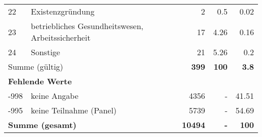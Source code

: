 \begin{longtable}{lXrrr}
        22 & \multicolumn{1}{X}{Existenzgründung} & %
          \num{2} &
          \num[round-mode=places,round-precision=2]{0,5} &
          \num[round-mode=places,round-precision=2]{0,02} \\

        23 & \multicolumn{1}{X}{betriebliches Gesundheitswesen, Arbeitssicherheit} & %
          \num{17} &
          \num[round-mode=places,round-precision=2]{4,26} &
          \num[round-mode=places,round-precision=2]{0,16} \\

        24 & \multicolumn{1}{X}{Sonstige} & %
          \num{21} &
          \num[round-mode=places,round-precision=2]{5,26} &
          \num[round-mode=places,round-precision=2]{0,2} \\

     \midrule
     \multicolumn{2}{l}{Summe (gültig)} &
       \textbf{\num{399}} &
     \textbf{100} &
       \textbf{\num[round-mode=places,round-precision=2]{3,8}} \\
     \multicolumn{5}{l}{\textbf{Fehlende Werte}}\\
       -998 &
       keine Angabe &
         \num{4356} &
        - &
         \num[round-mode=places,round-precision=2]{41,51} \\
       -995 &
       keine Teilnahme (Panel) &
         \num{5739} &
        - &
         \num[round-mode=places,round-precision=2]{54,69} \\
     \midrule
     \multicolumn{2}{l}{\textbf{Summe (gesamt)}} &
          \textbf{\num{10494}} &
        \textbf{-} &
        \textbf{100} \\
     \bottomrule
     \end{longtable}
     
